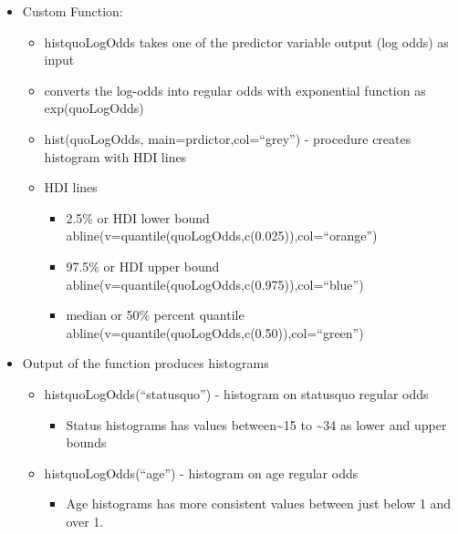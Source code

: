 \documentclass[]{article}
\providecommand{\tightlist}{%
  \setlength{\itemsep}{0pt}\setlength{\parskip}{0pt}}
\begin{document}
\begin{itemize}
\tightlist
\item
  Custom Function:

  \begin{itemize}
  \tightlist
  \item
    histquoLogOdds takes one of the predictor variable output (log odds)
    as input
  \item
    converts the log-odds into regular odds with exponential function as
    exp(quoLogOdds)
  \item
    hist(quoLogOdds, main=prdictor,col=``grey'') - procedure creates
    histogram with HDI lines
  \item
    HDI lines

    \begin{itemize}
    \tightlist
    \item
      2.5\% or HDI lower bound \textbar{}
      abline(v=quantile(quoLogOdds,c(0.025)),col=``orange'')
    \item
      97.5\% or HDI upper bound \textbar{}
      abline(v=quantile(quoLogOdds,c(0.975)),col=``blue'')
    \item
      median or 50\% percent quantile \textbar{}
      abline(v=quantile(quoLogOdds,c(0.50)),col=``green'')
    \end{itemize}
  \end{itemize}
\item
  Output of the function produces histograms

  \begin{itemize}
  \tightlist
  \item
    histquoLogOdds(``statusquo'') - histogram on statusquo regular odds

    \begin{itemize}
    \tightlist
    \item
      Status histograms has values between\textasciitilde{}15 to
      \textasciitilde{}34 as lower and upper bounds
    \end{itemize}
  \item
    histquoLogOdds(``age'') - histogram on age regular odds

    \begin{itemize}
    \tightlist
    \item
      Age histograms has more consistent values between just below 1 and
      over 1.
    \end{itemize}
  \end{itemize}
\end{itemize}
\end{document}
